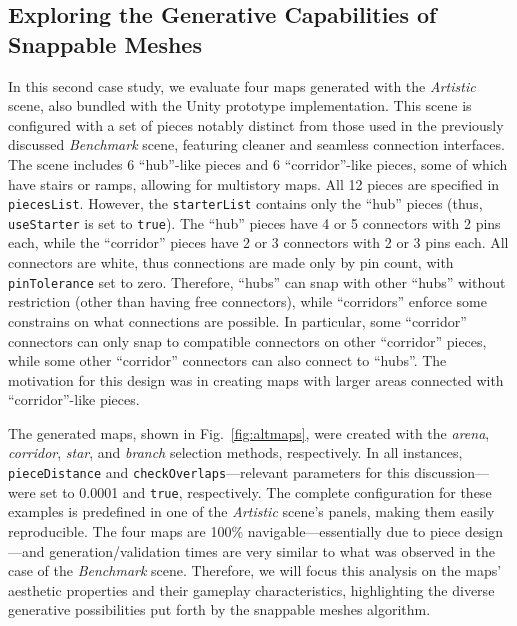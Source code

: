 \documentclass[journal]{IEEEtran}
\begin{document}
\subsection{Exploring the Generative Capabilities of Snappable Meshes}
\label{sec:casestudy:altpieces}

In this second case study, we evaluate four maps generated with the \textit{Artistic} scene,
also bundled with the Unity prototype implementation. This scene is configured with a set of
pieces notably distinct from those used in the previously discussed \textit{Benchmark} scene,
featuring cleaner and seamless connection interfaces. The scene includes 6 ``hub''-like pieces
and 6 ``corridor''-like pieces, some of which have stairs or ramps, allowing for multistory maps.
All 12 pieces are specified in \texttt{piecesList}. However, the \texttt{starterList} contains
only the ``hub'' pieces (thus, \texttt{useStarter} is set to \texttt{true}). The ``hub'' pieces
have 4 or 5 connectors with 2 pins each, while the ``corridor'' pieces have 2 or 3 connectors with
2 or 3 pins each. All connectors are white, thus connections are made only by pin count, with
\texttt{pinTolerance} set to zero. Therefore, ``hubs'' can snap with other ``hubs'' without
restriction (other than having free connectors), while ``corridors'' enforce some constrains on
what connections are possible. In particular, some ``corridor'' connectors can only snap to
compatible connectors on other ``corridor'' pieces, while some other ``corridor'' connectors can
also connect to ``hubs''. The motivation for this design was in creating maps with larger areas
connected with ``corridor''-like pieces.

The generated maps, shown in Fig.~\ref{fig:altmaps}, were created with the \textit{arena},
\textit{corridor}, \textit{star}, and \textit{branch} selection methods, respectively. In all
instances, \texttt{pieceDistance} and \texttt{checkOverlaps}---relevant parameters for this
discussion---were set to \num{0.0001} and \texttt{true}, respectively. The complete configuration
for these examples is predefined in one of the \textit{Artistic} scene's panels, making them easily
reproducible. The four maps are 100\% navigable---essentially due to piece design---and
generation/validation times are very similar to what was observed in the case of the
\textit{Benchmark} scene. Therefore, we will focus this analysis on the maps' aesthetic properties
and their gameplay characteristics, highlighting the diverse generative possibilities put forth by
the snappable meshes algorithm.
\end{document}
